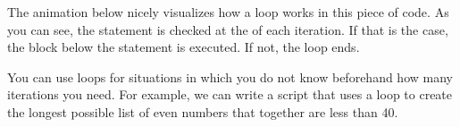 \documentclass[letterpaper,10pt,english]{jupyterBook}
\begin{document}
\begin{sphinxVerbatim}[commandchars=\\\{\}]
  
   
      
\end{sphinxVerbatim}

\sphinxAtStartPar
The animation below nicely visualizes how a  loop works in this piece of code. As you can see, the  statement is checked at the  of each iteration. If that is the case, the block below the  statement is executed. If not, the loop ends.

\sphinxAtStartPar
{}

\sphinxAtStartPar
You can use  loops for situations in which you do not know beforehand how many iterations you need. For example, we can write a script that uses a  loop to create the longest possible list of even numbers that together are less than 40.
\end{document}
